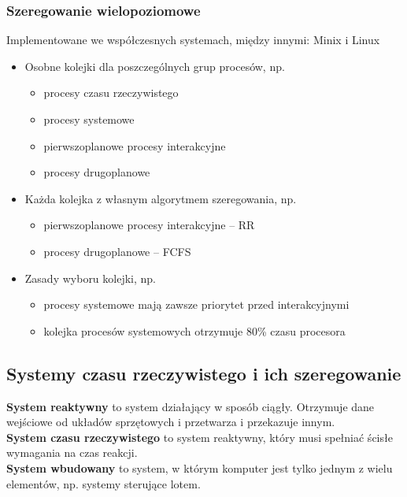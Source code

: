 \subsubsection{Szeregowanie wielopoziomowe}
Implementowane we współczesnych systemach, między innymi: Minix i Linux
\begin{itemize}
    \item Osobne kolejki dla poszczególnych grup procesów, np. 
        \begin{itemize}
        \item procesy czasu rzeczywistego
        \item procesy systemowe
        \item pierwszoplanowe procesy interakcyjne
        \item procesy drugoplanowe
        \end{itemize}
    \item Każda kolejka z własnym algorytmem szeregowania, np.
        \begin{itemize}
        \item pierwszoplanowe procesy interakcyjne – RR
        \item procesy drugoplanowe – FCFS
        \end{itemize}
    \item Zasady wyboru kolejki, np.
        \begin{itemize}
        \item procesy systemowe mają zawsze priorytet przed interakcyjnymi 
        \item kolejka procesów systemowych otrzymuje 80\% czasu procesora
        \end{itemize}
    \end{itemize}

\subsection{Systemy czasu rzeczywistego i ich szeregowanie}

\textbf{System reaktywny} to system działający w sposób ciągły. Otrzymuje dane wejściowe od układów sprzętowych i przetwarza i przekazuje innym. \\

\textbf{System czasu rzeczywistego} to system reaktywny, który musi spełniać ścisłe wymagania na czas reakcji. \\

\textbf{System wbudowany} to system, w którym komputer jest tylko jednym z wielu elementów, np. systemy sterujące lotem. \\


